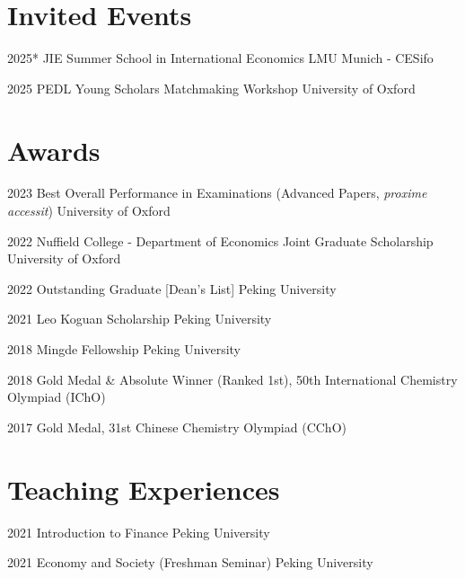 \documentclass[11pt,letterpaper]{report}
\begin{document}
    \section*{Invited Events}
    \begin{tablist}
        \item[2025*] \tab{}JIE Summer School in International Economics \hfill LMU Munich - CESifo
        \item[2025] \tab{}PEDL Young Scholars Matchmaking Workshop \hfill University of Oxford
        
    \end{tablist}

    \section*{Awards}

    \begin{tablist}
        \item[2023] \tab{}Best Overall Performance in Examinations (Advanced Papers, \textit{proxime accessit}) \hfill University of Oxford
        \item[2022] \tab{}Nuffield College - Department of Economics Joint Graduate Scholarship \hfill University of Oxford
        \item[2022] \tab{}Outstanding Graduate [Dean's List] \hfill Peking University
        \item[2021] \tab{}Leo Koguan Scholarship \hfill Peking University
        \item[2018] \tab{}Mingde Fellowship \hfill Peking University \\
        \vspace{1.5em}
        \item[2018] \tab{}Gold Medal \& Absolute Winner (Ranked 1st), 50th International Chemistry Olympiad (IChO)
        \item[2017] \tab{}Gold Medal, 31st Chinese Chemistry Olympiad (CChO)

    \end{tablist}

    \section*{Teaching Experiences}
     \begin{tablist}
        \item[2021] \tab{}Introduction to Finance \hfill Peking University
        \item[2021] \tab{}Economy and Society (Freshman Seminar) \hfill Peking University
        
    \end{tablist}
    
\end{document}
